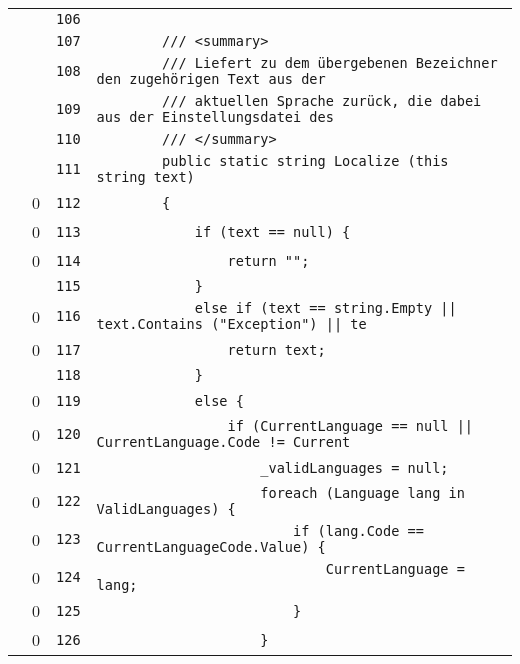 \documentclass[a4paper,10pt]{article}
\begin{document}
\begin{longtable}[l]{lrrl}
\cellcolor{gray} &  & \verb~106~ & \verb~~\\
\cellcolor{gray} &  & \verb~107~ & \verb~        /// <summary>~\\
\cellcolor{gray} &  & \verb~108~ & \verb~        /// Liefert zu dem übergebenen Bezeichner den zugehörigen Text aus der~\\
\cellcolor{gray} &  & \verb~109~ & \verb~        /// aktuellen Sprache zurück, die dabei aus der Einstellungsdatei des ~\\
\cellcolor{gray} &  & \verb~110~ & \verb~        /// </summary>~\\
\cellcolor{gray} &  & \verb~111~ & \verb~        public static string Localize (this string text)~\\
\cellcolor{red} & 0 & \verb~112~ & \verb~        {~\\
\cellcolor{red} & 0 & \verb~113~ & \verb~            if (text == null) {~\\
\cellcolor{red} & 0 & \verb~114~ & \verb~                return "";~\\
\cellcolor{gray} &  & \verb~115~ & \verb~            }~\\
\cellcolor{red} & 0 & \verb~116~ & \verb~            else if (text == string.Empty || text.Contains ("Exception") || te~\\
\cellcolor{red} & 0 & \verb~117~ & \verb~                return text;~\\
\cellcolor{gray} &  & \verb~118~ & \verb~            }~\\
\cellcolor{red} & 0 & \verb~119~ & \verb~            else {~\\
\cellcolor{red} & 0 & \verb~120~ & \verb~                if (CurrentLanguage == null || CurrentLanguage.Code != Current~\\
\cellcolor{red} & 0 & \verb~121~ & \verb~                    _validLanguages = null;~\\
\cellcolor{red} & 0 & \verb~122~ & \verb~                    foreach (Language lang in ValidLanguages) {~\\
\cellcolor{red} & 0 & \verb~123~ & \verb~                        if (lang.Code == CurrentLanguageCode.Value) {~\\
\cellcolor{red} & 0 & \verb~124~ & \verb~                            CurrentLanguage = lang;~\\
\cellcolor{red} & 0 & \verb~125~ & \verb~                        }~\\
\cellcolor{red} & 0 & \verb~126~ & \verb~                    }~\\

\end{longtable}
\end{document}
